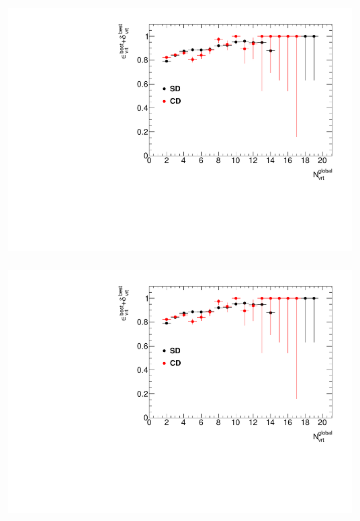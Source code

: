 \begin{figure}[H]
	\centering
	\parbox{0.3\textwidth}{
		\centering
		\begin{subfigure}[b]{\linewidth}{
				{\includegraphics[width=\linewidth, page=4]{graphics/vertexing/vertexEffi.pdf}}}
		\end{subfigure}
	}
	\quad
	\parbox{0.3\textwidth}{
		\centering
		\begin{subfigure}[b]{\linewidth}{
				{\includegraphics[width=\linewidth, page=7]{graphics/vertexing/vertexEffi.pdf}}}
		\end{subfigure}
	}
	\parbox{0.3\textwidth}{
		\centering
}
\end{figure}
